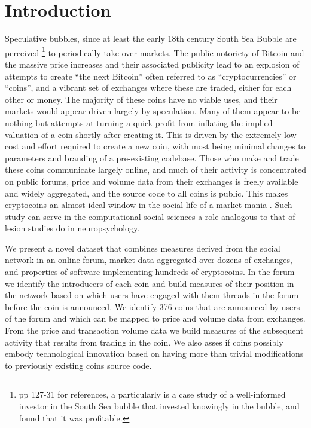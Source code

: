 \section{Introduction}

Speculative bubbles, since at least the early 18th century South Sea Bubble are perceived \footnote{\cite{garber2001famous} pp 127-31 for references, a particularly is \cite{temin2004riding} a case study of a well-informed investor in the South Sea bubble that invested knowingly in the bubble, and found that it was profitable. } to periodically take over markets. %
The public notoriety of Bitcoin and the massive price increases and their associated publicity  lead to an explosion of attempts to create ``the next Bitcoin'' often referred to as ``cryptocurrencies'' or ``coins'', and a vibrant set of exchanges where these are traded, either for each other or money.
The majority of these coins have no viable uses, and their markets would appear driven largely by speculation.
Many of them appear to be nothing but attempts at turning a quick profit from inflating the implied valuation of a coin shortly after creating it.
This is driven by the extremely low cost and effort required to create a new coin, with most being minimal changes to parameters and branding of a pre-existing codebase.
Those who make and trade these coins communicate largely online, and much of their activity is concentrated on public forums, price and volume data from their exchanges is freely available and widely aggregated, and the source code to all coins is public.
This makes cryptocoins an almost ideal window in the social life of a market mania \cite{cosma2008}.
Such study can serve in the computational social sciences a role analogous to that of lesion studies do in neuropsychology.



We present a novel dataset that combines measures derived from the social network in an online forum, market data aggregated over dozens of exchanges, and properties of software implementing hundreds of cryptocoins.
In the forum we identify the introducers of each coin and build measures of their position in the network based on which users have engaged with them threads in the forum before the coin is announced.
We identify 376 coins that are announced by users of the forum and which can be mapped to price and volume data from exchanges.
From the price and transaction volume data we build measures of the subsequent activity that results from trading in the coin. 
We also asses if coins possibly embody technological innovation based on having more than trivial modifications to previously existing coins source code.

